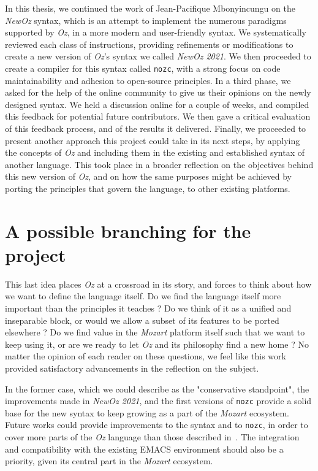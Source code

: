 In this thesis, we continued the work of Jean-Pacifique Mbonyincungu on the \textit{NewOz} syntax, which is an attempt to implement the numerous paradigms supported by \textit{Oz}, in a more modern and user-friendly syntax.
We systematically reviewed each class of instructions, providing refinements or modifications to create a new version of \textit{Oz}'s syntax we called \textit{NewOz 2021}.
We then proceeded to create a compiler for this syntax called \texttt{nozc}, with a strong focus on code maintainability and adhesion to open-source principles.
In a third phase, we asked for the help of the online community to give us their opinions on the newly designed syntax.
We held a discussion online for a couple of weeks, and compiled this feedback for potential future contributors.
We then gave a critical evaluation of this feedback process, and of the results it delivered.
Finally, we proceeded to present another approach this project could take in its next steps, by applying the concepts of \textit{Oz} and including them in the existing and established syntax of another language.
This took place in a broader reflection on the objectives behind this new version of \textit{Oz}, and on how the same purposes might be achieved by porting the principles that govern the language, to other existing platforms.\newline

\section{A possible branching for the project}\label{sec:ch5-a-possible-branching-for-the-project}
This last idea places \textit{Oz} at a crossroad in its story, and forces to think about how we want to define the language itself.
Do we find the language itself more important than the principles it teaches ?
Do we think of it as a unified and inseparable block, or would we allow a subset of its features to be ported elsewhere ?
Do we find value in the \textit{Mozart} platform itself such that we want to keep using it, or are we ready to let \textit{Oz} and its philosophy find a new home ?
No matter the opinion of each reader on these questions, we feel like this work provided satisfactory advancements in the reflection on the subject.\newline

In the former case, which we could describe as the "conservative standpoint", the improvements made in \textit{NewOz 2021}, and the first versions of \texttt{nozc} provide a solid base for the new syntax to keep growing as a part of the \textit{Mozart} ecosystem.
Future works could provide improvements to the syntax and to \texttt{nozc}, in order to cover more parts of the \textit{Oz} language than those described in~\cite{van2004concepts}.
The integration and compatibility with the existing EMACS environment should also be a priority, given its central part in the \textit{Mozart} ecosystem.\newline

